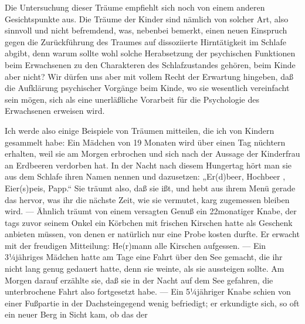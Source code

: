 \documentclass[twoside=true,titlepage=false,open=any, parskip=never, fontsize=10pt, headings=small, chapterprefix=false, appendixprefix=false]{scrbook}
\begin{document}
         
            
            
            
        \pstart
        Die Untersuchung dieser Träume empfiehlt sich noch von einem anderen
               Gesichtspunkte aus. Die Träume der Kinder sind nämlich von solcher Art, also sinnvoll und nicht befremdend, was,
               nebenbei bemerkt, einen neuen Einspruch gegen die Zurückführung des
               Traumes auf dissoziierte Hirntätigkeit im Schlafe abgibt, denn warum sollte wohl
               solche Herabsetzung der psychischen Funktionen beim Erwachsenen zu
               den Charakteren des Schlafzustandes gehören, beim Kinde aber nicht? Wir dürfen
               uns aber mit vollem Recht der Erwartung hingeben, daß die Aufklärung psychischer Vorgänge beim Kinde, wo sie wesentlich vereinfacht sein mögen, sich als eine unerläßliche Vorarbeit für die Psychologie
               des Erwachsenen erweisen wird.
        \pend
    
            
        \pstart
        Ich werde also einige Beispiele von Träumen mitteilen, die ich von Kindern
               gesammelt habe: Ein Mädchen von 19 Monaten wird über einen Tag nüchtern
               erhalten, weil sie am Morgen erbrochen und sich nach der Aussage der Kinderfrau
               an Erdbeeren verdorben hat. In der Nacht nach diesem Hungertag
               hört man sie aus dem Schlafe ihren Namen nennen und dazusetzen: „Er(d)beer, Hochbeer
    , Eier(s)peis, Papp.“ 
     Sie träumt also,
               daß sie ißt, und hebt aus ihrem Menü gerade das hervor, was ihr die nächste
               Zeit, wie sie vermutet, karg zugemessen bleiben wird. — Ähnlich träumt von einem
               versagten Genuß ein 22monatiger Knabe, der tags zuvor seinem Onkel
               ein Körbchen mit frischen Kirschen hatte als Geschenk anbieten müssen, von
               denen er natürlich nur eine Probe kosten durfte. Er erwacht mit der
               freudigen Mitteilung: He(r)mann alle Kirschen aufgessen.
               — Ein 3¼jähriges Mädchen hatte am Tage eine Fahrt über den See gemacht, die
               ihr nicht lang genug gedauert hatte, denn sie weinte, als sie aussteigen sollte.
               Am Morgen darauf erzählte sie, daß sie in der Nacht auf dem See gefahren, die
               unterbrochene Fahrt also fortgesetzt habe. — Ein 5¼jähriger Knabe schien
               von einer Fußpartie in der Dachsteingegend wenig befriedigt; er erkundigte
               sich, so oft ein neuer Berg in Sicht kam, ob das der
        \pend
    
\end{document}
